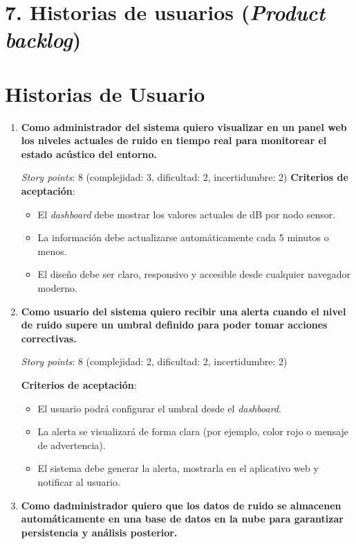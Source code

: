 \documentclass[
11pt, %
]{charter}
\begin{document}
\section{7. Historias de usuarios (\textit{Product backlog})}
\label{sec:backlog}

\section{Historias de Usuario}

\begin{enumerate}
    \item \textbf{Como administrador del sistema quiero visualizar en un panel web los niveles actuales de ruido en tiempo real para monitorear el estado acústico del entorno.}

    \textit{Story points}: 8 (complejidad: 3, dificultad: 2, incertidumbre: 2)
    \clearpage
    \textbf{Criterios de aceptación}:
    \begin{itemize}
        \item El \textit{dashboard} debe mostrar los valores actuales de dB por nodo sensor.
        \item La información debe actualizarse automáticamente cada 5 minutos o menos.
        \item El diseño debe ser claro, responsivo y accesible desde cualquier navegador moderno.
    \end{itemize}

    \item \textbf{Como usuario del sistema quiero recibir una alerta cuando el nivel de ruido supere un umbral definido para poder tomar acciones correctivas.}

    \textit{Story points}: 8 (complejidad: 2, dificultad: 2, incertidumbre: 2)

    \textbf{Criterios de aceptación}:
    \begin{itemize}
        \item El usuario podrá configurar el umbral desde el \textit{dashboard}.
        \item La alerta se visualizará de forma clara (por ejemplo, color rojo o mensaje de advertencia).
        \item El sistema debe generar la alerta, mostrarla en el aplicativo web y notificar al usuario.
    \end{itemize}

    \item \textbf{Como dadministrador quiero que los datos de ruido se almacenen automáticamente en una base de datos en la nube para garantizar persistencia y análisis posterior.}


\end{enumerate}
\end{document}
